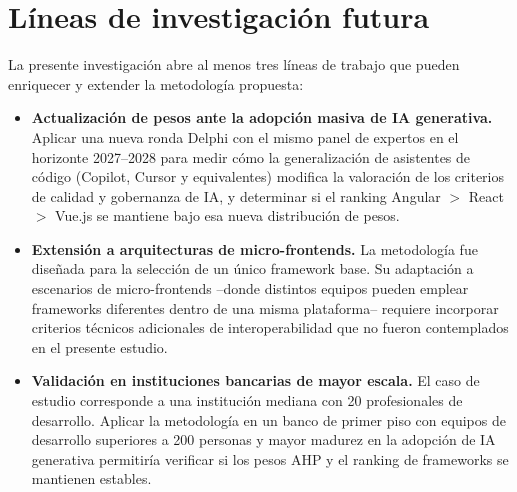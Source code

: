 \section*{Líneas de investigación futura}

La presente investigación abre al menos tres líneas de trabajo que pueden
enriquecer y extender la metodología propuesta:

\begin{itemize}
  \item \textbf{Actualización de pesos ante la adopción masiva de IA
        generativa.} Aplicar una nueva ronda Delphi con el mismo panel de
        expertos en el horizonte 2027--2028 para medir cómo la
        generalización de asistentes de código (Copilot, Cursor y
        equivalentes) modifica la valoración de los criterios de calidad y
        gobernanza de IA, y determinar si el ranking Angular $>$ React $>$
        Vue.js se mantiene bajo esa nueva distribución de pesos.

  \item \textbf{Extensión a arquitecturas de micro-frontends.} La
        metodología fue diseñada para la selección de un único framework
        base. Su adaptación a escenarios de micro-frontends --donde
        distintos equipos pueden emplear frameworks diferentes dentro de
        una misma plataforma-- requiere incorporar criterios técnicos
        adicionales de interoperabilidad que no fueron contemplados en el
        presente estudio.

  \item \textbf{Validación en instituciones bancarias de mayor escala.} El
        caso de estudio corresponde a una institución mediana con 20
        profesionales de desarrollo. Aplicar la metodología en un banco de
        primer piso con equipos de desarrollo superiores a 200 personas y
        mayor madurez en la adopción de IA generativa permitiría verificar
        si los pesos AHP y el ranking de frameworks se mantienen estables.
\end{itemize}
